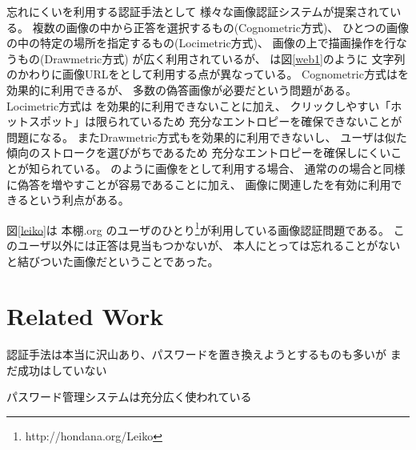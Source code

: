 \documentclass{article}
\begin{document}
忘れにくい{\EM}を利用する認証手法として
様々な画像認証システム\cite{Biddle:2012:GPL:2333112.2333114}\cite{GraphicalPasswords}\cite{小池英樹:2006-05-15}が提案されている。
複数の画像の中から正答を選択するもの(Cognometric方式)、
ひとつの画像の中の特定の場所を指定するもの(Locimetric方式)、
画像の上で描画操作を行なうもの(Drawmetric方式)
が広く利用されているが\cite{Biddle:2012:GPL:2333112.2333114}\cite{GraphicalPasswords}\cite{Guideline}、
{\EP}は図\ref{web1}のように
文字列のかわりに画像URLを{\SQ}として利用する点が異なっている。
%
Cognometric方式は{\EM}を効果的に利用できるが、
多数の偽答画像が必要だという問題がある。
Locimetric方式は
{\EM}を効果的に利用できないことに加え、
クリックしやすい「ホットスポット」は限られているため
充分なエントロピーを確保できないことが問題になる\cite{Dirik:2007:MUC:1280680.1280684}。
またDrawmetric方式も{\EM}を効果的に利用できないし、
ユーザは似た傾向のストロークを選びがちであるため
充分なエントロピーを確保しにくいことが知られている\cite{Nali}。
%
{\EP}のように画像を{\SQ}として利用する場合、
通常の{\SQ}の場合と同様に偽答を増やすことが容易であることに加え、
画像に関連した{\EM}を有効に利用できるという利点がある\cite{増井:CSS}。

図\ref{leiko}は
本棚.org\cite{hondana}\cite{hondanaorg}
のユーザのひとり\footnote{
  \textsf{http://hondana.org/Leiko}
}が利用している画像認証問題である。
このユーザ以外には正答は見当もつかないが、
本人にとっては忘れることがない{\EM}と結びついた画像だということであった。

% 
% 
% 
%

\section{Related Work}

認証手法は本当に沢山あり、パスワードを置き換えようとするものも多いが
まだ成功はしていない

パスワード管理システムは充分広く使われている

\cite{Stobert:2014:PMD:2683467.2683471} %

% 
% 
% 
% 
% 
%
\end{document}
